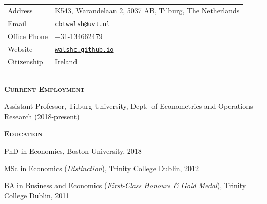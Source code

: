 \documentclass[11pt,overlapped,line,letterpaper]{article}
\newcommand{\cvsec}[1]{\vspace{\baselineskip}\textbf{\textsc{#1}}}
\newcommand{\name}[1]{\textsc{\textrm{\textbf{{\fontsize{16}{20}\selectfont{#1}}}}}\\}
\newenvironment{list1}{
  \begin{list}{\ding{113}}{%
      \setlength{\itemsep}{0in}\setlength{\itemindent}{-1.5em}
      \setlength{\parsep}{0in}\setlength{\parskip}{0in}
      \setlength{\topsep}{0in}\setlength{\partopsep}{0in}
      \setlength{\leftmargin}{0.5in}}}{\end{list}}
\begin{document}
\name{Christoph Walsh} \\
\hspace{-2.3mm}\begin{tabular}{ll}
  Address      & K543, Warandelaan 2, 5037 AB, Tilburg, The Netherlands \\
  Email        & \href{mailto:cbtwalsh@uvt.nl}{\texttt{cbtwalsh@uvt.nl}} \\
  Office Phone & +31-134662479 \\
  Website      & \href{https://walshc.github.io}{\texttt{walshc.github.io}} \\
  Citizenship  & Ireland \\
\end{tabular}
\smallskip

\rule{\textwidth}{0.4pt}

\cvsec{Current Employment}
\begin{list1}
\item[] Assistant Professor, Tilburg University, Dept.~of Econometrics and Operations Research (2018-present)
\end{list1}

\cvsec{Education}
\begin{list1}
  \item[] PhD in Economics, Boston University, 2018
  \vspace{5pt}
\item[] MSc in Economics (\emph{Distinction}), Trinity College Dublin, 2012
  \vspace{5pt}
\item[] BA in Business and Economics (\emph{First-Class Honours \& Gold Medal}), Trinity College Dublin, 2011
\end{list1}


\end{document}
